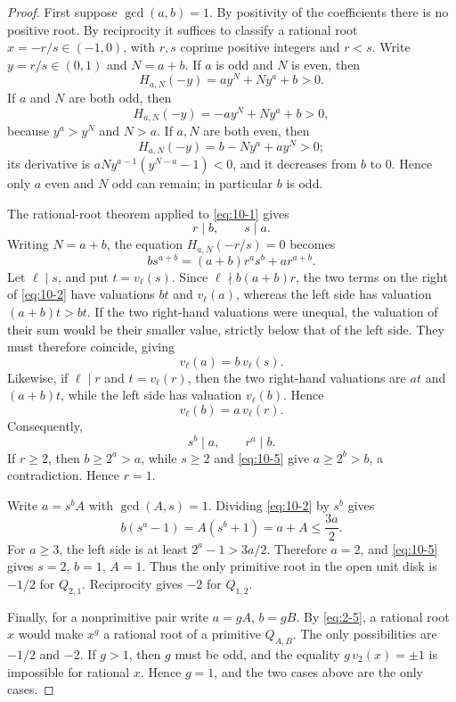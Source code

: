 \documentclass[11pt]{article}
\numberwithin{equation}{section}
\theoremstyle{definition}
\begin{document}
\begin{proof}
First suppose \(\gcd(a,b)=1\).  By positivity of the coefficients there is no
positive root.  By reciprocity it suffices to classify a rational root
\(x=-r/s\in(-1,0)\), with \(r,s\) coprime positive integers and \(r<s\).
Write $y=r/s\in(0,1)$ and $N=a+b$.  If \(a\) is odd and \(N\) is even, then
\[
 H_{a,N}(-y)=ay^N+Ny^a+b>0.
\]
If \(a\) and \(N\) are both odd, then
\[
 H_{a,N}(-y)=-ay^N+Ny^a+b>0,
\]
because \(y^a>y^N\) and \(N>a\).  If \(a,N\) are both even, then
\[
 H_{a,N}(-y)=b-Ny^a+ay^N>0;
\]
its derivative is \(aN y^{a-1}(y^{N-a}-1)<0\), and it decreases from
\(b\) to \(0\).  Hence only \(a\) even and \(N\) odd can remain; in
particular \(b\) is odd.

The rational-root theorem applied to \eqref{eq:10-1} gives
\[
 r\mid b,\qquad s\mid a.
\]
Writing \(N=a+b\), the equation \(H_{a,N}(-r/s)=0\) becomes
\begin{equation}
 b s^{a+b}=(a+b)r^a s^b+a r^{a+b}.
 \label{eq:10-2}
\end{equation}
Let \(\ell\mid s\), and put \(t=v_\ell(s)\).  Since
\(\ell\nmid b(a+b)r\), the two terms on the right of \eqref{eq:10-2} have
valuations \(bt\) and \(v_\ell(a)\), whereas the left side has valuation
\((a+b)t>bt\).  If the two right-hand valuations were unequal, the
valuation of their sum would be their smaller value, strictly below that of
the left side.  They must therefore coincide, giving
\begin{equation}
 v_\ell(a)=b\,v_\ell(s).
 \label{eq:10-3}
\end{equation}
Likewise, if \(\ell\mid r\) and \(t=v_\ell(r)\), then the two right-hand
valuations are \(at\) and \((a+b)t\), while the left side has valuation
\(v_\ell(b)\).  Hence
\begin{equation}
 v_\ell(b)=a\,v_\ell(r).
 \label{eq:10-4}
\end{equation}
Consequently,
\begin{equation}
 s^b\mid a,
 \qquad
 r^a\mid b.
 \label{eq:10-5}
\end{equation}
If \(r\geq2\), then \(b\geq2^a>a\), while \(s\geq2\) and \eqref{eq:10-5} give
\(a\geq2^b>b\), a contradiction.  Hence \(r=1\).

Write \(a=s^bA\) with \(\gcd(A,s)=1\).  Dividing \eqref{eq:10-2} by \(s^b\)
gives
\begin{equation}
 b(s^a-1)=A(s^b+1)=a+A\leq\frac{3a}{2}.
 \label{eq:10-6}
\end{equation}
For \(a\geq3\), the left side is at least \(2^a-1>3a/2\).  Therefore
\(a=2\), and \eqref{eq:10-5} gives \(s=2\), \(b=1\), \(A=1\).  Thus the only
primitive root in the open unit disk is \(-1/2\) for \(Q_{2,1}\).  Reciprocity
gives \(-2\) for \(Q_{1,2}\).

Finally, for a nonprimitive pair write \(a=gA\), \(b=gB\).  By \eqref{eq:2-5}, a
rational root \(x\) would make \(x^g\) a rational root of a primitive
\(Q_{A,B}\).  The only possibilities are \(-1/2\) and \(-2\).  If \(g>1\), then \(g\)
must be odd, and the equality \(g\,v_2(x)=\pm1\) is impossible for rational
\(x\).  Hence \(g=1\), and the two cases above are the only cases.
\end{proof}
\end{document}
